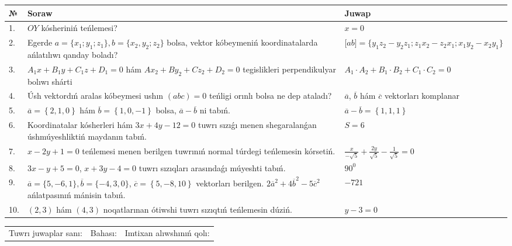 \documentclass{article}
\begin{document}
\begin{tabular}{|m{0.7cm}|m{10cm}|m{4cm}|}
\hline
№ & Soraw & Juwap \\
\hline
1. & $OY$ kósheriniń teńlemesi? & $x=0$ \\
\hline
2. & Egerde $a=\{ x_1; y_1; z_1\}, b=\{ x_2, y_2; z_2\}$ bolsa, vektor kóbeymeniń koordinatalarda ańlatılıwı qanday boladı? &  $\lbrack ab\rbrack=\{y_1z_2-y_2z_1; z_1x_2-z_2x_1; x_1y_2-x_2y_1\}$ \\
\hline
3. & $A_1x+B_1y+C_1z+D_1=0$ hám $Ax_2+By_2+Cz_2+D_2=0$ tegislikleri perpendikulyar bolıwı shárti & $A_1\cdot A_2+B_1\cdot B_2+C_1\cdot C_2=0$ \\
\hline
4. & Úsh vektordıń aralas kóbeymesi ushın $(abc)=0$ teńligi orınlı bolsa ne dep ataladı? & $\overline{a}$, $\overline{b}$ hám $\overline{c}$ vektorları komplanar \\
\hline
5. & $\overline{a}=\left\{ 2, 1, 0 \right\}$ hám $\overline{b}=\left\{ 1, 0,-1 \right\}$ bolsa, $\overline{a}-\overline{b}$ ni tabıń. & $\overline{a} -\overline{b} = \left\{ 1,1,1 \right\}$ \\
\hline
6. & Koordinatalar kósherleri hám $ 3x+4y-12=0 $ tuwrı sızıǵı menen shegaralanǵan úshmúyeshliktiń maydanın tabıń. & $ S=6 $ \\
\hline
7. & $x-2y+1=0$ teńlemesi menen berilgen tuwrınıń normal túrdegi teńlemesin kórsetiń. & $\frac{x}{- \sqrt{5}}+\frac{2y}{\sqrt{5}}-\frac{1}{\sqrt{5}}=0$ \\
\hline
8. & $3x-y+5=0$, $x+3y-4=0$ tuwrı sızıqları arasındaǵı múyeshti tabıń. & $90^{0}$ \\
\hline
9. & $\overline{a}=\{5,-6, 1 \}, \overline{b}=\{-4, 3, 0 \} $, $\overline{c}=\left\{ 5,-8, 10 \right\}$ vektorları berilgen. $2{\overline{a}}^{2}+4{\overline{b}}^{2}-5{\overline{c}}^{2}$ ańlatpasınıń mánisin tabıń. & $-721$ \\
\hline
10. & $(2, 3)$ hám $(4, 3)$ noqatlarınan ótiwshi tuwrı sızıqtıń teńlemesin dúziń. & $ y-3=0$ \\
\hline
\end{tabular}

\vspace{1cm}

\begin{tabular}{lll}
Tuwrı juwaplar sanı: \underline{\hspace{1.5cm}} & 
Bahası: \underline{\hspace{1.5cm}} & 
Imtixan alıwshınıń qolı: \underline{\hspace{2cm}} \\
\end{tabular}
\end{document}
